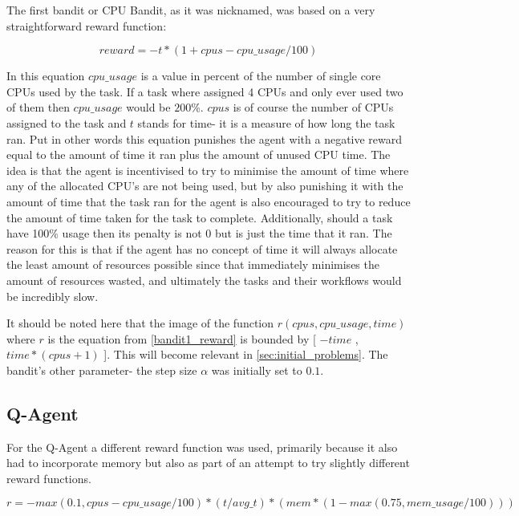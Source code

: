 The first bandit or CPU Bandit, as it was nicknamed, was based on a very straightforward reward function:

\begin{equation}\label{bandit1_reward}
reward = -t*(1+cpus - cpu\_usage/100)
\end{equation}


In this equation $cpu\_usage$ is a value in percent of the number of single core CPUs used by the task. If a task where assigned 4 CPUs and only ever used two of them then $cpu\_usage$ would be $200$\%. $cpus$ is of course the number of CPUs assigned to the task and $t$ stands for time- it is a measure of how long the task ran. Put in other words this equation punishes the agent with a negative reward equal to the amount of time it ran plus the amount of unused CPU time. The idea is that the agent is incentivised to try to minimise the amount of time where any of the allocated CPU’s are not being used, but by also punishing it with the amount of time that the task ran for the agent is also encouraged to try to reduce the amount of time taken for the task to complete. Additionally, should a task have 100\% usage then its penalty is not 0 but is just the time that it ran. The reason for this is that if the agent has no concept of time it will always allocate the least amount of resources possible since that immediately minimises the amount of resources wasted, and ultimately the tasks and their workflows would be incredibly slow. 

It should be noted here that the image of the function $r(cpus,cpu\_usage,time)$ where $r$ is the equation from \ref{bandit1_reward} is bounded by [ $-time$ , $time*(cpus+1)$ ]. This will become relevant in \ref{sec:initial_problems}. The bandit’s other parameter- the step size $\alpha$ was initially set to $0.1$. 

\subsection{Q-Agent}
\label{sub:q_agent}

For the Q-Agent a different reward function was used, primarily because it also had to incorporate memory but also as part of an attempt to try slightly different reward functions. 

\begin{equation}\label{q_agent_1_reward}
r = -max(0.1,cpus-cpu\_usage/100) * (t/avg\_t) * (mem* (1 - max(0.75,mem\_usage/100)))
\end{equation}

